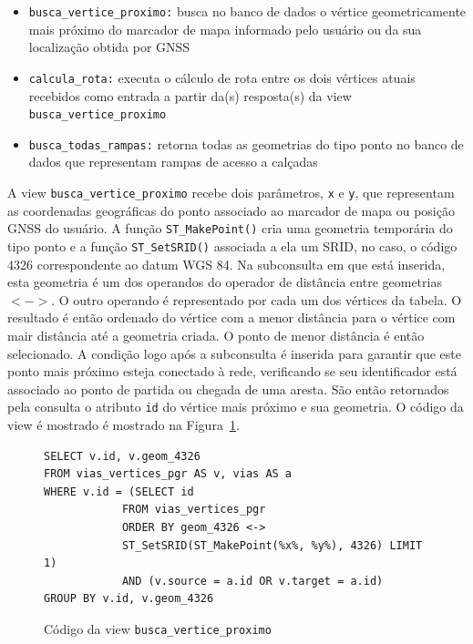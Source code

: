 \documentclass[oneside,openright,12pt]{ufsm_2015} %
\begin{document}
\begin{itemize}
    \item {\tt busca\_vertice\_proximo:} busca no banco de dados o vértice geometricamente mais próximo do marcador de mapa informado pelo usuário ou da sua localização obtida por GNSS
    \item {\tt calcula\_rota:} executa o cálculo de rota entre os dois vértices atuais recebidos como entrada a partir da(s) resposta(s) da view {\tt busca\_vertice\_proximo}
    \item {\tt busca\_todas\_rampas:} retorna todas as geometrias do tipo ponto no banco de dados que representam rampas de acesso a calçadas
\end{itemize}    
    A view {\tt busca\_vertice\_proximo} recebe dois parâmetros, {\tt x} e {\tt y}, que representam as coordenadas geográficas do ponto associado ao marcador de mapa ou posição GNSS do usuário. A função {\tt ST\_MakePoint()} cria uma geometria temporária do tipo ponto e a função {\tt ST\_SetSRID()} associada a ela um SRID, no caso, o código 4326 correspondente ao datum WGS 84. Na subconsulta em que está inserida, esta geometria é um dos operandos do operador de distância entre geometrias $< - >$. O outro operando é representado por cada um dos vértices da tabela. O resultado é então ordenado do vértice com a menor distância para o vértice com mair distância até a geometria criada. O ponto de menor distância é então selecionado. A condição logo após a subconsulta é inserida para garantir que este ponto mais próximo esteja conectado à rede, verificando se seu identificador está associado ao ponto de partida ou chegada de uma aresta. São então retornados pela consulta o atributo {\tt id} do vértice mais próximo e sua geometria.
O código da view é mostrado é mostrado na Figura~\ref{codigo:view_vertice}.
   
   
\begin{figure}[h!]
    \centering
      \caption{Código da view \tt{busca\_vertice\_proximo}}
    \label{codigo:view_vertice}
\begin{lstlisting}[]
SELECT v.id, v.geom_4326
FROM vias_vertices_pgr AS v, vias AS a
WHERE v.id = (SELECT id
            FROM vias_vertices_pgr
            ORDER BY geom_4326 <->
            ST_SetSRID(ST_MakePoint(%x%, %y%), 4326) LIMIT 1)
            AND (v.source = a.id OR v.target = a.id)
GROUP BY v.id, v.geom_4326
\end{lstlisting}
  
\end{figure} 
\end{document}

